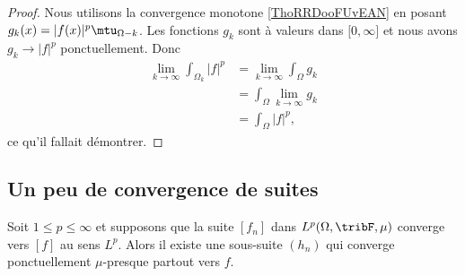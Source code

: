 \begin{proof}
	Nous utilisons la convergence monotone \ref{ThoRRDooFUvEAN} en posant \( g_k(x)=| f(x) |^p\mtu_{\Omega-k}\). Les fonctions \( g_k\) sont à valeurs dans \( \mathopen[ 0,\infty\mathclose]\) et nous avons \( g_k\to | f |^p\) ponctuellement. Donc
	\begin{subequations}
		\begin{align}
			\lim_{k\to \infty}\int_{\Omega_k}| f |^p & =\lim_{k\to \infty}\int_{\Omega}g_k \\
			                                         & =\int_{\Omega}\lim_{k\to\infty}g_k  \\
			                                         & =\int_{\Omega}| f |^p,
		\end{align}
	\end{subequations}
	ce qu'il fallait démontrer.
\end{proof}


\subsection{Un peu de convergence de suites}

\begin{proposition}  \label{PropWoywYG}
	Soit \( 1\leq p\leq \infty\) et supposons que la suite \( [f_n]\) dans \( L^p(\Omega,\tribF,\mu)\) converge vers \( [f]\) au sens \( L^p\). Alors il existe une sous-suite \( (h_n)\) qui converge ponctuellement \( \mu\)-presque partout vers \( f\).
\end{proposition}

